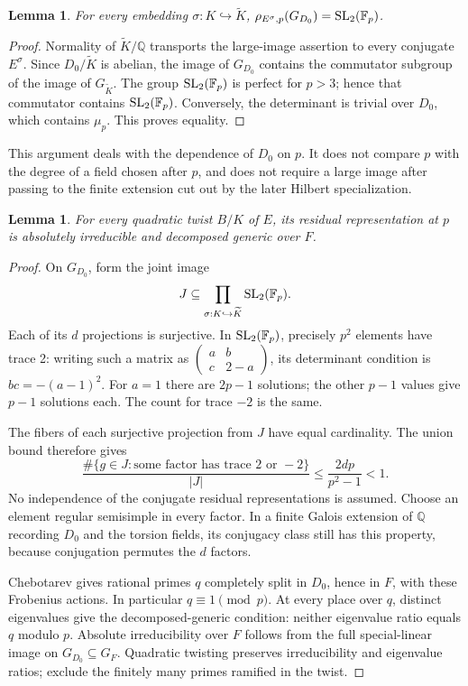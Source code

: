 \documentclass[11pt,a4paper]{article}
\newtheorem{lemma}[theorem]{Lemma}
\theoremstyle{definition}\newtheorem{definition}[theorem]{Definition}
\theoremstyle{remark}\newtheorem*{remark}{Remark}
\newcommand{\Q}{\mathbb Q}\newcommand{\Z}{\mathbb Z}
\newcommand{\F}{\mathbb F}\newcommand{\OO}{\mathcal O}
\begin{document}
\begin{lemma}\label{lem:survives}
For every embedding \(\sigma:K\hookrightarrow\widetilde K\),
\(\rho_{E^\sigma,p}(G_{D_0})=\SL_2(\F_p)\).
\end{lemma}
\begin{proof}
Normality of \(\widetilde K/\Q\) transports the large-image assertion to every
conjugate \(E^\sigma\). Since \(D_0/\widetilde K\) is abelian, the image of
\(G_{D_0}\) contains the commutator subgroup of the image of
\(G_{\widetilde K}\). The group \(\SL_2(\F_p)\) is perfect for \(p>3\);
hence that commutator contains \(\SL_2(\F_p)\). Conversely, the determinant is
trivial over \(D_0\), which contains \(\mu_p\). This proves equality.
\end{proof}
This argument deals with the dependence of \(D_0\) on \(p\). It does not compare
\(p\) with the degree of a field chosen after \(p\), and does not require a
large image after passing to the finite extension cut out by the later
Hilbert specialization.

\begin{lemma}\label{lem:genericE}
For every quadratic twist \(B/K\) of \(E\), its residual representation at \(p\)
is absolutely irreducible and decomposed generic over \(F\).
\end{lemma}
\begin{proof}
On \(G_{D_0}\), form the joint image
\[
 J\subseteq\prod_{\sigma:K\hookrightarrow\widetilde K}\SL_2(\F_p).
\]
Each of its \(d\) projections is surjective. In \(\SL_2(\F_p)\), precisely
\(p^2\) elements have trace 2: writing such a matrix as
\(\left(\begin{smallmatrix}a&b\\c&2-a\end{smallmatrix}\right)\), its determinant
condition is \(bc=-(a-1)^2\). For \(a=1\) there are \(2p-1\) solutions;
the other \(p-1\) values give \(p-1\) solutions each. The count for trace
\(-2\) is the same.

The fibers of each surjective projection from \(J\) have equal cardinality.
The union bound therefore gives
\begin{equation}
 \frac{\#\{g\in J:\text{some factor has trace }2\text{ or }-2\}}{|J|}
 \leq \frac{2dp}{p^2-1}<1.                     \label{eq:union-bound}
\end{equation}
No independence of the conjugate residual representations is assumed.
Choose an element regular semisimple in every factor. In a finite Galois
extension of \(\Q\) recording \(D_0\) and the torsion fields, its conjugacy
class still has this property, because conjugation permutes the \(d\) factors.

Chebotarev gives rational primes \(q\) completely split in \(D_0\), hence in
\(F\), with these Frobenius actions. In particular \(q\equiv1\pmod p\).
At every place over \(q\), distinct eigenvalues give the decomposed-generic
condition: neither eigenvalue ratio equals \(q\) modulo \(p\).
Absolute irreducibility over \(F\) follows from the full special-linear image
on \(G_{D_0}\subseteq G_F\). Quadratic twisting preserves irreducibility and
eigenvalue ratios; exclude the finitely many primes ramified in the twist.
\end{proof}
\end{document}
